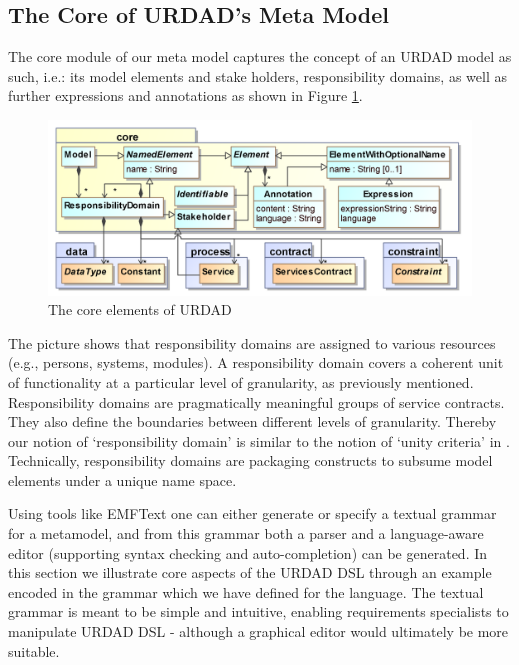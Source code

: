 \subsection{The Core of URDAD's Meta Model}

The core module of our meta model captures the concept of an URDAD model as such, i.e.: its model elements and stake holders, responsibility domains, as well as further expressions and annotations as shown in Figure \ref{fig:metamodel-1}.
\begin{figure}[Htb]
  \centering
  \includegraphics{core}
  \caption{The core elements of URDAD}
  \label{fig:metamodel-1}
\end{figure}

The picture shows that responsibility domains are assigned to various resources (e.g., persons, systems, modules). A 
responsibility domain covers a coherent unit of functionality at a particular level of granularity, as previously mentioned. Responsibility domains are pragmatically meaningful groups of service contracts. They also define the boundaries between different levels of granularity. Thereby our notion of `responsibility domain' is similar to the notion of `unity criteria' in \cite{gonzalez_unity_2009}. Technically, responsibility domains are packaging constructs to subsume model elements under a unique name space.

Using tools like EMFText \cite{heidenreich_derivation_2009} one can either generate or specify a textual grammar for a metamodel, and from this grammar both a parser and a language-aware editor (supporting syntax checking and auto-completion) can be generated. In this section we illustrate core aspects of the URDAD DSL through an example encoded in the grammar which we have defined for the language. The textual grammar is meant to be simple and intuitive, enabling requirements specialists to manipulate URDAD DSL - although a graphical editor would ultimately be more suitable.

